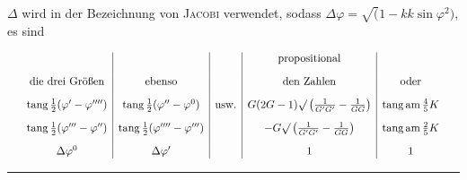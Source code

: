 $\Delta$ wird in der Bezeichnung von \textsc{Jacobi} verwendet, sodass $\Delta\varphi=\surd(1-kk\sin\varphi^2)$,
es sind
\par\nopagebreak%
\begingroup\small\setlength{\arraycolsep}{2pt}\[
\resizebox{.98\linewidth}{!}{$\displaystyle \begin{array}{c|c|c|c|c} & & &\text{propositional}&\\[9pt] \text{die drei Größen}&\text{ebenso}&&\text{den Zahlen}&\text{oder}\\[9pt] \operatorname{tang}\frac12(\varphi'-\varphi'''')& \operatorname{tang}\frac12(\varphi''-\varphi^0)&\text{usw.}& G(2G-1)\surd\left(\frac{1}{G'G'}-\frac{1}{GG}\right)& \operatorname{tang}\operatorname{am}\frac45K\\[9pt] \operatorname{tang}\frac12(\varphi'''-\varphi'')& \operatorname{tang}\frac12(\varphi''''-\varphi''')&& -G\surd\left(\frac{1}{G'G'}-\frac{1}{GG}\right)& \operatorname{tang}\operatorname{am}\frac25K\\[9pt] \Delta\varphi^0&\Delta\varphi'&&1&1 \end{array}$}
\]\endgroup\par%

\par\nopagebreak\begin{center}\rule{.25\textwidth}{.4pt}\end{center}
\clearpage
\endgroup
